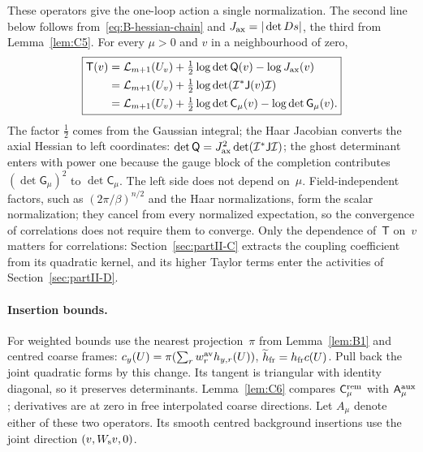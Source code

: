 These operators give the one-loop action a single normalization. The second line below follows from~\eqref{eq:B-hessian-chain} and $J_{\rm ax}=|\det Ds|$, the third from Lemma~\ref{lem:C5}. For every $\mu>0$ and $v$ in a neighbourhood of zero,
\begin{equation}\label{eq:B-one-loop-box}
\boxed{\begin{aligned}
\mathsf T(v)&=\mathcal L_{m+1}(U_v)+\tfrac12\log\det\mathsf Q(v)-\log J_{\rm ax}(v)\\
&=\mathcal L_{m+1}(U_v)+\tfrac12\log\det(\mathcal I^*\mathsf J(v)\mathcal I)\\
&=\mathcal L_{m+1}(U_v)+\tfrac12\log\det\mathsf C_\mu(v)-\log\det\mathsf G_\mu(v).
\end{aligned}}
\end{equation}
The factor $\tfrac12$ comes from the Gaussian integral; the Haar Jacobian converts the axial Hessian to left coordinates: $\det\mathsf Q=J_{\rm ax}^2\det(\mathcal I^*\mathsf J\mathcal I)$; the ghost determinant enters with power one because the gauge block of the completion contributes $(\det\mathsf G_\mu)^2$ to $\det\mathsf C_\mu$. The left side does not depend on~$\mu$. Field-independent factors, such as $(2\pi/\beta)^{n/2}$ and the Haar normalizations, form the scalar normalization; they cancel from every normalized expectation, so the convergence of correlations does not require them to converge. Only the dependence of~$\mathsf T$ on~$v$ matters for correlations: Section~\ref{sec:partII-C} extracts the coupling coefficient from its quadratic kernel, and its higher Taylor terms enter the activities of Section~\ref{sec:partII-D}.

\paragraph{Insertion bounds.} For weighted bounds use the nearest projection~$\pi$ from Lemma~\ref{lem:B1} and centred coarse frames: $c_y(U)=\pi(\sum_r w_r^{\rm av}h_{y,r}(U))$, $\widetilde h_{\rm fr}=h_{\rm fr}c(U)$. Pull back the joint quadratic forms by this change. Its tangent is triangular with identity diagonal, so it preserves determinants. Lemma~\ref{lem:C6} compares $\mathsf C^{\rm rem}_\mu$ with $\mathsf A^{\rm aux}_\mu$; derivatives are at zero in free interpolated coarse directions. Let $A_\mu$ denote either of these two operators. Its smooth centred background insertions use the joint direction $(v,W_{\rm s}v,0)$.

